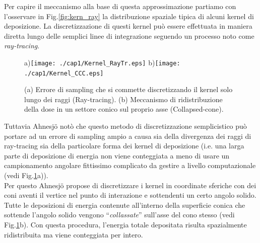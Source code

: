 {Per capire il meccanismo alla base di questa approssimazione partiamo con l'osservare in Fig.\ref{fig:kern_ray} la distribuzione spaziale tipica di alcuni kernel di deposizione. La discretizzazione di questi kernel può essere effettuata in maniera diretta lungo delle semplici linee di integrazione seguendo un processo noto come \textit{ray-tracing}.
\begin{figure}
\centering
a)\texttt{[image: ./cap1/Kernel\_RayTr.eps]}
b)\texttt{[image: ./cap1/Kernel\_CCC.eps]}
\caption{(a) Errore di sampling che si commette discretizzando il kernel solo lungo dei raggi (Ray-tracing). (b) Meccanismo di ridistribuzione della dose in un settore conico sul proprio asse (Collapsed-cone).}
\label{fig:raytrace_vs_cc}
\end{figure}
Tuttavia Ahnesj\"{o} notò che questo metodo di discretizzazione semplicistico può portare ad un errore di sampling ampio a causa sia della divergenza dei raggi di ray-tracing sia della particolare forma dei kernel di deposizione  \cite{Ahnesjo1989} (i.e. una larga parte di deposizione di energia non viene conteggiata a meno di usare un campionamento angolare fittissimo complicato da gestire a livello computazionale (vedi Fig.\ref{fig:raytrace_vs_cc}a)).\\
Per questo Ahnesj\"{o} propose di discretizzare i kernel in coordinate sferiche con dei coni aventi il vertice nel punto di interazione e sottendenti un certo angolo solido. Tutte le deposizioni di energia contenute all'interno della superficie conica che sottende l'angolo solido vengono \textquotedblleft\textit{collassate}\textquotedblright{} sull'asse del cono stesso (vedi Fig.\ref{fig:raytrace_vs_cc}b). Con questa procedura, l'energia totale depositata risulta spazialmente ridistribuita ma viene conteggiata per intero.

}

